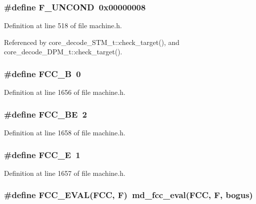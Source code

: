 \subsubsection[{F\_\-UNCOND}]{\setlength{\rightskip}{0pt plus 5cm}\#define F\_\-UNCOND~0x00000008}\label{machine_8h_099a2f044ceb531d0eca49c590219828}




Definition at line 518 of file machine.h.

Referenced by core\_\-decode\_\-STM\_\-t::check\_\-target(), and core\_\-decode\_\-DPM\_\-t::check\_\-target().
\subsubsection[{FCC\_\-B}]{\setlength{\rightskip}{0pt plus 5cm}\#define FCC\_\-B~0}\label{machine_8h_7cee1dd9fe0a40cca0f9de0c2412e330}




Definition at line 1656 of file machine.h.
\subsubsection[{FCC\_\-BE}]{\setlength{\rightskip}{0pt plus 5cm}\#define FCC\_\-BE~2}\label{machine_8h_bee99de2b79498ec311f87330ca22c82}




Definition at line 1658 of file machine.h.
\subsubsection[{FCC\_\-E}]{\setlength{\rightskip}{0pt plus 5cm}\#define FCC\_\-E~1}\label{machine_8h_4e9d2ae7333e6061a97e547754d8a8d0}




Definition at line 1657 of file machine.h.
\subsubsection[{FCC\_\-EVAL}]{\setlength{\rightskip}{0pt plus 5cm}\#define FCC\_\-EVAL(FCC, \/  F)~md\_\-fcc\_\-eval(FCC, F, bogus)}\label{machine_8h_49dc7f32d7fef90b6e2f63aaf8778825}




